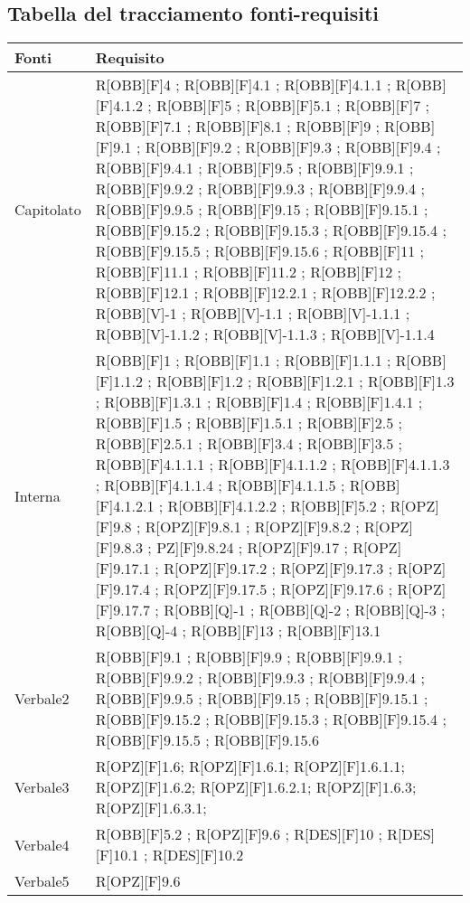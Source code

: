 \subsection{Tabella del tracciamento fonti-requisiti}
	\begin{table}[H]
		\centering
		\begin{tabular}{|p{}|p{}|}
			\toprule
			
			\textbf{Fonti} & \textbf{Requisito} \\
			
			\midrule

			Capitolato & R[OBB][F]4 ; R[OBB][F]4.1 ; R[OBB][F]4.1.1 ; R[OBB][F]4.1.2 ; R[OBB][F]5 ; R[OBB][F]5.1 ; R[OBB][F]7 ; R[OBB][F]7.1 ; R[OBB][F]8.1 ; R[OBB][F]9 ; R[OBB][F]9.1 ; R[OBB][F]9.2 ; R[OBB][F]9.3 ; R[OBB][F]9.4 ; R[OBB][F]9.4.1 ; R[OBB][F]9.5 ; R[OBB][F]9.9.1 ; R[OBB][F]9.9.2 ; R[OBB][F]9.9.3 ; R[OBB][F]9.9.4 ; R[OBB][F]9.9.5 ; R[OBB][F]9.15 ; R[OBB][F]9.15.1 ; R[OBB][F]9.15.2 ; R[OBB][F]9.15.3 ; R[OBB][F]9.15.4 ; R[OBB][F]9.15.5 ; R[OBB][F]9.15.6 ; R[OBB][F]11 ; R[OBB][F]11.1 ; R[OBB][F]11.2 ;  R[OBB][F]12 ; R[OBB][F]12.1 ; R[OBB][F]12.2.1 ; R[OBB][F]12.2.2 ; R[OBB][V]-1 ; R[OBB][V]-1.1 ; R[OBB][V]-1.1.1 ; R[OBB][V]-1.1.2 ; R[OBB][V]-1.1.3 ; R[OBB][V]-1.1.4 \\ \midrule

			Interna & R[OBB][F]1 ; R[OBB][F]1.1 ; R[OBB][F]1.1.1 ; R[OBB][F]1.1.2 ; R[OBB][F]1.2 ; R[OBB][F]1.2.1 ; R[OBB][F]1.3 ; R[OBB][F]1.3.1 ;  R[OBB][F]1.4 ; R[OBB][F]1.4.1 ; R[OBB][F]1.5 ; R[OBB][F]1.5.1 ; R[OBB][F]2.5 ; R[OBB][F]2.5.1 ; R[OBB][F]3.4 ; R[OBB][F]3.5 ; R[OBB][F]4.1.1.1 ; R[OBB][F]4.1.1.2 ; R[OBB][F]4.1.1.3 ; R[OBB][F]4.1.1.4 ; R[OBB][F]4.1.1.5 ; R[OBB][F]4.1.2.1 ; R[OBB][F]4.1.2.2 ; R[OBB][F]5.2 ; R[OPZ][F]9.8 ; R[OPZ][F]9.8.1 ; R[OPZ][F]9.8.2 ; R[OPZ][F]9.8.3 ; PZ][F]9.8.24 ; R[OPZ][F]9.17 ; R[OPZ][F]9.17.1 ; R[OPZ][F]9.17.2 ; R[OPZ][F]9.17.3 ; R[OPZ][F]9.17.4 ; R[OPZ][F]9.17.5 ; R[OPZ][F]9.17.6 ; R[OPZ][F]9.17.7 ; R[OBB][Q]-1 ; R[OBB][Q]-2 ; R[OBB][Q]-3 ; R[OBB][Q]-4 ; R[OBB][F]13 ; R[OBB][F]13.1\\ \midrule
			
			Verbale2 & R[OBB][F]9.1 ; R[OBB][F]9.9 ; R[OBB][F]9.9.1 ; R[OBB][F]9.9.2 ; R[OBB][F]9.9.3 ; R[OBB][F]9.9.4 ; R[OBB][F]9.9.5 ; R[OBB][F]9.15 ; R[OBB][F]9.15.1 ; R[OBB][F]9.15.2 ; R[OBB][F]9.15.3 ; R[OBB][F]9.15.4 ; R[OBB][F]9.15.5 ; R[OBB][F]9.15.6 \\ \midrule
			Verbale3 & R[OPZ][F]1.6; R[OPZ][F]1.6.1; R[OPZ][F]1.6.1.1; R[OPZ][F]1.6.2; R[OPZ][F]1.6.2.1; R[OPZ][F]1.6.3; R[OPZ][F]1.6.3.1; \\ \midrule
			Verbale4 & R[OBB][F]5.2 ; R[OPZ][F]9.6 ; R[DES][F]10 ; R[DES][F]10.1 ; R[DES][F]10.2 \\ \midrule
			Verbale5 & R[OPZ][F]9.6  \\ \midrule

		\end{tabular}
	\end{table}

